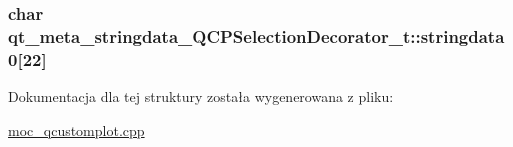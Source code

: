 \subsubsection[{\texorpdfstring{stringdata0}{stringdata0}}]{\setlength{\rightskip}{0pt plus 5cm}char qt\+\_\+meta\+\_\+stringdata\+\_\+\+Q\+C\+P\+Selection\+Decorator\+\_\+t\+::stringdata0\mbox{[}22\mbox{]}}\hypertarget{structqt__meta__stringdata___q_c_p_selection_decorator__t_a396f24ff22a1439774cf0634b5080197}{}\label{structqt__meta__stringdata___q_c_p_selection_decorator__t_a396f24ff22a1439774cf0634b5080197}


Dokumentacja dla tej struktury została wygenerowana z pliku\+:\begin{DoxyCompactItemize}
\item 
\hyperlink{moc__qcustomplot_8cpp}{moc\+\_\+qcustomplot.\+cpp}\end{DoxyCompactItemize}
